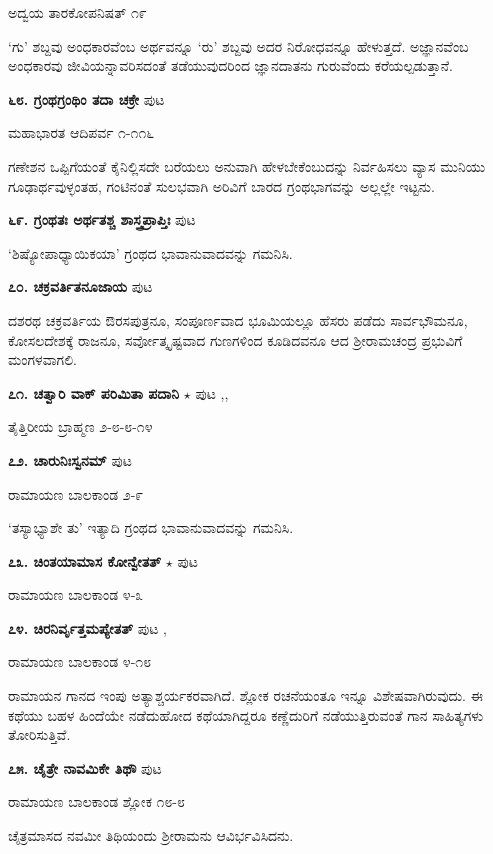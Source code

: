 \hfill ಅದ್ವಯ ತಾರಕೋಪನಿಷತ್ ೧೯

`ಗು' ಶಬ್ದವು ಅಂಧಕಾರವೆಂಬ ಅರ್ಥವನ್ನೂ `ರು' ಶಬ್ದವು ಅದರ ನಿರೋಧವನ್ನೂ ಹೇಳುತ್ತದೆ. ಅಜ್ಞಾನವೆಂಬ ಅಂಧಕಾರವು ಜೀವಿಯನ್ನಾವರಿಸದಂತೆ ತಡೆಯುವುದರಿಂದ ಜ್ಞಾನದಾತನು ಗುರುವೆಂದು ಕರೆಯಲ್ಪಡುತ್ತಾನೆ.

\medskip
\noindent\textbf{೬೮. ಗ್ರಂಥಗ್ರಂಥಿಂ ತದಾ ಚಕ್ರೇ} \hfill ಪುಟ \pageref{119}

\hfill ಮಹಾಭಾರತ ಆದಿಪರ್ವ ೧-೧೧೬

ಗಣೇಶನ ಒಪ್ಪಿಗೆಯಂತೆ ಕೈನಿಲ್ಲಿಸದೇ ಬರೆಯಲು ಅನುವಾಗಿ ಹೇಳಬೇಕೆಂಬುದನ್ನು ನಿರ್ವಹಿಸಲು ವ್ಯಾಸ ಮುನಿಯು ಗೂಢಾರ್ಥವುಳ್ಳಂತಹ, ಗಂಟಿನಂತೆ ಸುಲಭವಾಗಿ ಅರಿವಿಗೆ ಬಾರದ ಗ್ರಂಥಭಾಗವನ್ನು ಅಲ್ಲಲ್ಲೇ ಇಟ್ಟನು.

\medskip
\noindent\textbf{೬೯. ಗ್ರಂಥತಃ ಅರ್ಥತಶ್ಚ ಶಾಸ್ತ್ರಪ್ರಾಪ್ತಿಃ} \hfill ಪುಟ \pageref{105}

\hfill `ಶಿಷ್ಯೋಪಾಧ್ಯಾಯಿಕಯಾ' ಗ್ರಂಥದ ಭಾವಾನುವಾದವನ್ನು ಗಮನಿಸಿ.

\medskip
\noindent\textbf{೭೦. ಚಕ್ರವರ್ತಿತನೂಜಾಯ}  \hfill ಪುಟ \pageref{193}

ದಶರಥ ಚಕ್ರವರ್ತಿಯ ಔರಸಪುತ್ರನೂ, ಸಂಪೂರ್ಣವಾದ ಭೂಮಿಯಲ್ಲೂ ಹೆಸರು ಪಡೆದು ಸಾರ್ವಭೌಮನೂ, ಕೋಸಲದೇಶಕ್ಕೆ ರಾಜನೂ, ಸರ್ವೋತ್ಕೃಷ್ಟವಾದ ಗುಣಗಳಿಂದ ಕೂಡಿದವನೂ ಆದ ಶ್ರೀರಾಮಚಂದ್ರ ಪ್ರಭುವಿಗೆ ಮಂಗಳವಾಗಲಿ.

\medskip
\noindent\textbf{೭೧. ಚತ್ವಾರಿ ವಾಕ್ ಪರಿಮಿತಾ ಪದಾನಿ} $\star$ \hfill ಪುಟ \pageref{22},\pageref{153b},\pageref{252}

\hfill ತೈತ್ತಿರೀಯ ಬ್ರಾಹ್ಮಣ ೨-೮-೮-೧೪

\medskip
\noindent\textbf{೭೨. ಚಾರುನಿಃಸ್ವನಮ್} \hfill ಪುಟ \pageref{250}

\hfill ರಾಮಾಯಣ ಬಾಲಕಾಂಡ ೨-೯

`ತಸ್ಯಾಭ್ಯಾಶೇ ತು' ಇತ್ಯಾದಿ ಗ್ರಂಥದ ಭಾವಾನುವಾದವನ್ನು ಗಮನಿಸಿ.

\medskip
\noindent\textbf{೭೩. ಚಿಂತಯಾಮಾಸ ಕೋನ್ವೇತತ್} $\star$ \hfill ಪುಟ \pageref{158a}

\hfill ರಾಮಾಯಣ ಬಾಲಕಾಂಡ ೪-೩

\medskip
\noindent\textbf{೭೪. ಚಿರನಿರ್ವೃತ್ತಮಪ್ಯೇತತ್} \hfill ಪುಟ \pageref{204b},\pageref{243}

\hfill ರಾಮಾಯಣ ಬಾಲಕಾಂಡ ೪-೧೮

ರಾಮಾಯನ ಗಾನದ ಇಂಪು ಅತ್ಯಾಶ್ಚರ್ಯಕರವಾಗಿದೆ. ಶ್ಲೋಕ ರಚನೆಯಂತೂ ಇನ್ನೂ ವಿಶೇಷವಾಗಿರುವುದು. ಈ ಕಥೆಯು ಬಹಳ ಹಿಂದೆಯೇ ನಡೆದುಹೋದ ಕಥೆಯಾಗಿದ್ದರೂ ಕಣ್ಣೆದುರಿಗೆ ನಡೆಯುತ್ತಿರುವಂತೆ ಗಾನ ಸಾಹಿತ್ಯಗಳು ತೋರಿಸುತ್ತಿವೆ.

\medskip
\noindent\textbf{೭೫. ಚೈತ್ರೇ ನಾವಮಿಕೇ ತಿಥೌ} \hfill ಪುಟ \pageref{147}

\hfill ರಾಮಾಯಣ ಬಾಲಕಾಂಡ ಶ್ಲೋಕ ೧೮-೮

ಚೈತ್ರಮಾಸದ ನವಮೀ ತಿಥಿಯಂದು ಶ್ರೀರಾಮನು ಆವಿರ್ಭವಿಸಿದನು.

